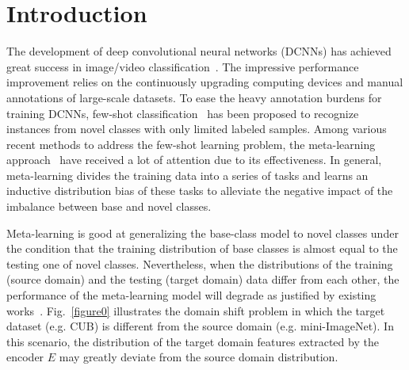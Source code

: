 \documentclass[runningheads]{utils/llncs}
\begin{document}
\section{Introduction}
The development of deep convolutional neural networks (DCNNs) has achieved great success in image/video classification~\cite{HeZGLLLWW19,LiW0019,TanL19,WuHLLGD21}. 
The impressive performance improvement relies on the continuously upgrading computing devices and manual annotations of large-scale datasets.
To ease the heavy annotation burdens for training DCNNs, few-shot classification~\cite{lake2015human} has been proposed to recognize instances from novel classes with only limited labeled samples.
Among various recent methods to address the few-shot learning problem, the meta-learning approach~\cite{pmlr-v70-finn17a,FrikhaKKT21,LiuCLL0LH20,NIPS2017_cb8da676,SuiCMQLZ21,Sung_2018_CVPR,NIPS2016_90e13578,WuSLPZ20} have received a lot of attention due to its effectiveness. 
In general, meta-learning divides the training data into a series of tasks and learns an inductive distribution bias of these tasks to alleviate the negative impact of the imbalance between base and novel classes.  



Meta-learning is good at generalizing the base-class model to novel classes under the condition that the training distribution of base classes is almost equal to the testing one of novel classes.
Nevertheless, when the distributions of the training (source domain) and the testing (target domain) data differ from each other, the performance of the meta-learning model will degrade as justified by existing works~\cite{ChenLKWH19,GuoCKCSSRF20}.
Fig.~\ref{figure0} illustrates the domain shift problem in which the target dataset (e.g. CUB) is different from the source domain (e.g. mini-ImageNet).
In this scenario, the distribution of the target domain features extracted by the encoder $E$ may greatly deviate from the source domain distribution.
\end{document}
